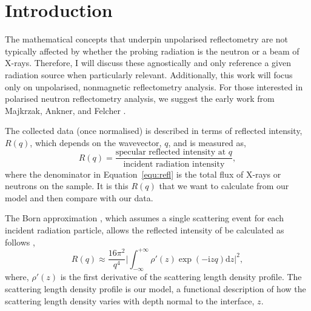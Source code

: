 \documentclass[
 reprint,
 superscriptaddress,
 amsmath,amssymb,
 aps,
]{revtex4-1}
\begin{document}
\section{Introduction}
The mathematical concepts that underpin unpolarised reflectometry are not typically affected by whether the probing radiation is the neutron or a beam of X-rays. 
Therefore, I will discuss these agnostically and only reference a given radiation source when particularly relevant.
Additionally, this work will focus only on unpolarised, nonmagnetic reflectometry analysis. 
For those interested in polarised neutron reflectometry analysis, we suggest the early work from Majkrzak, Ankner, and Felcher \cite{majkrzak_exact_1991,majkrzak_advances_1995,ankner_polarized_1999,felcher_polarized_1999}.

The collected data (once normalised) is described in terms of reflected intensity, $R(q)$, which depends on the wavevector, $q$, and is measured as,
%
\begin{equation}
    R(q) = \frac{\text{specular reflected intensity at $q$}}{\text{incident radiation intensity}}, 
    \label{equ:refl}
\end{equation}
%
where the denominator in Equation~\ref{equ:refl} is the total flux of X-rays or neutrons on the sample.
It is this $R(q)$ that we want to calculate from our model and then compare with our data. 

The Born approximation \cite{born_quantenmechanik_1926}, which assumes a single scattering event for each incident radiation particle, allows the reflected intensity of be calculated as follows \cite{sivia_elementary_2011},
%
\begin{equation}
    R(q) \approx \frac{16\pi^2}{q^4} \bigg| \int^{+\infty}_{-\infty}{\rho'(z)\exp{(-\mathrm{i} zq) \text{d}z} \bigg|^2},
    \label{equ:kine}
\end{equation}
%
where, $\rho'(z)$ is the first derivative of the scattering length density profile.
The scattering length density profile is our model, a functional description of how the scattering length density varies with depth normal to the interface, $z$.
\end{document}
